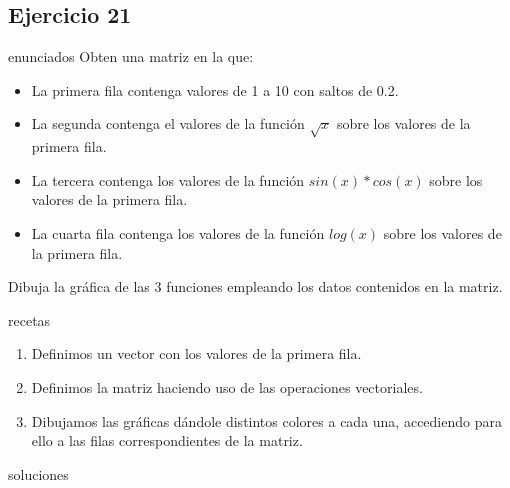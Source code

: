 \subsection{Ejercicio 21}
\def\parte{enunciados}
\ifx\capitulo\parte
Obten una matriz en la que:
\begin{itemize}
\item La primera fila contenga valores de 1 a 10 con saltos de 0.2.
\item La segunda contenga el valores de la función $\sqrt{x}$ sobre los valores de la primera fila.
\item La tercera contenga los valores de la función $sin(x)*cos(x)$ sobre los valores de la primera fila.
\item La cuarta fila contenga los valores de la función $log(x)$ sobre los valores de la primera fila.
\end{itemize}

Dibuja la gráfica de las 3 funciones empleando los datos contenidos en la matriz.
\fi

\def\parte{recetas}
\ifx\capitulo\parte
\begin{enumerate}
\item Definimos un vector con los valores de la primera fila.
\item Definimos la matriz haciendo uso de las operaciones vectoriales.
\item Dibujamos las gráficas dándole distintos colores a cada una, accediendo para ello a las filas correspondientes de la matriz.
\end{enumerate}
\fi

\def\parte{soluciones}
\ifx\capitulo\parte

\fi
